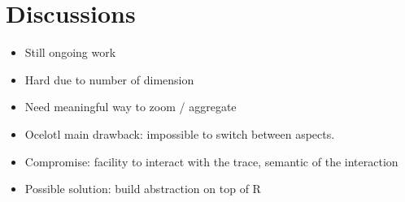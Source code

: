 \section{Discussions}

\begin{itemize}
    \item Still ongoing work
    \item Hard due to number of dimension
    \item Need meaningful way to zoom / aggregate
    \item Ocelotl main drawback: impossible to switch between aspects.
    \item Compromise: facility to interact with the trace, semantic of the interaction
    \item Possible solution: build abstraction on top of R
\end{itemize}

